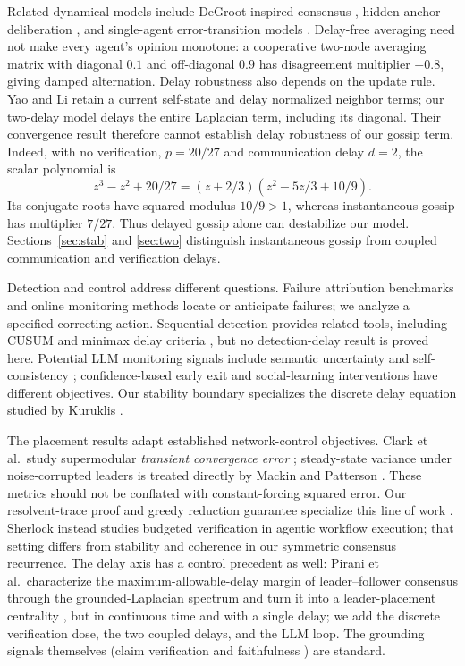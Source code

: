 \documentclass[11pt]{article}
\theoremstyle{definition}
\begin{document}
Related dynamical models include DeGroot-inspired consensus \cite{OpinionConsensus},
hidden-anchor deliberation \cite{HiddenAnchors}, and single-agent error-transition models
\cite{SelfCorrFeedback}. Delay-free averaging need not make every agent's opinion monotone:
a cooperative two-node averaging matrix with diagonal $0.1$ and off-diagonal $0.9$ has disagreement
multiplier $-0.8$, giving damped alternation. Delay robustness also depends on the update rule.
Yao and Li \cite{YaoLi} retain a current self-state and delay normalized neighbor terms;
our two-delay model delays the entire Laplacian term, including its diagonal. Their convergence
result therefore cannot establish delay robustness of our gossip term. Indeed, with no verification,
$p=20/27$ and communication delay $d=2$, the scalar polynomial is
\[
 z^3-z^2+20/27=(z+2/3)(z^2-5z/3+10/9).
\]
Its conjugate roots have squared modulus $10/9>1$, whereas instantaneous gossip has multiplier
$7/27$. Thus delayed gossip alone can destabilize our model. Sections~\ref{sec:stab} and
\ref{sec:two} distinguish instantaneous gossip from coupled communication and verification delays.

Detection and control address different questions. Failure attribution benchmarks
\cite{AgentHallu,WhoWhen,TRAIL} and online monitoring methods \cite{AgentForesight,CASPIAN,GUARDIAN}
locate or anticipate failures; we analyze a specified correcting action. Sequential detection
provides related tools, including CUSUM and minimax delay criteria
\cite{Page,Lorden,Pollak,Moustakides,Lai,VeeraBanerjee,XieQCD,TNB}, but no detection-delay
result is proved here. Potential LLM monitoring signals include semantic uncertainty and
self-consistency \cite{SemEntropy,SelfCheck,HallSurvey}; confidence-based early exit
\cite{EntropyCoT} and social-learning interventions \cite{JainKrishnamurthy} have different objectives.
Our stability boundary specializes the discrete delay equation studied by Kuruklis \cite{Kuruklis}.

The placement
results adapt established network-control objectives. Clark et al.\ study supermodular
\emph{transient convergence error} \cite{ClarkLeader}; steady-state variance under noise-corrupted
leaders is treated directly by Mackin and Patterson \cite{MackinPatterson}. These metrics should
not be conflated with constant-forcing squared error. Our resolvent-trace proof and greedy reduction
guarantee specialize this line of work \cite{ClarkSubmod,PiraniSundaram,Nemhauser}.
Sherlock \cite{Sherlock} instead studies budgeted verification in agentic workflow execution;
that setting differs from stability and coherence in our symmetric consensus recurrence.
The delay axis has a control precedent as
well: Pirani et al.\ characterize the maximum-allowable-delay margin of leader--follower consensus
through the grounded-Laplacian spectrum and turn it into a leader-placement centrality
\cite{PiraniRobust}, but in continuous time and with a single delay; we add the discrete verification
dose, the two coupled delays, and the LLM loop. The grounding signals themselves (claim
verification and faithfulness \cite{FEVER,RAG}) are standard.
\end{document}
